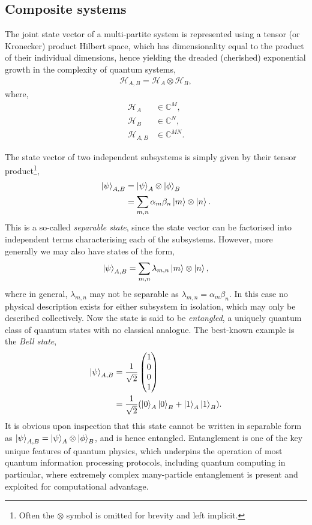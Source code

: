 \documentclass[aps,pra,twocolumn,amsmath,amssymb,nofootinbib,superscriptaddress]{revtex4}
\begin{document}
%
%

\subsection{Composite systems}

The joint state vector of a multi-partite system is represented using a tensor (or Kronecker) product Hilbert space, which has dimensionality equal to the product of their individual dimensions, hence yielding the dreaded (cherished) exponential growth in the complexity of quantum systems,
\begin{align}
\mathcal{H}_{A,B} = \mathcal{H}_A\otimes \mathcal{H}_B,	
\end{align}
where,
\begin{align}
\mathcal{H}_A &\in\mathbb{C}^M,\nonumber\\
\mathcal{H}_B &\in\mathbb{C}^N,\nonumber\\
\mathcal{H}_{A,B} &\in\mathbb{C}^{MN}.	
\end{align}

The state vector of two independent subsystems is simply given by their tensor product\footnote{Often the $\otimes$ symbol is omitted for brevity and left implicit.},
\begin{align}
\ket\psi_{A,B} &= \ket\psi_A \otimes \ket\phi_B\nonumber\\
&=\sum_{m,n} \alpha_m\beta_n\ket{m}\otimes\ket{n}.
\end{align}
This is a so-called \textit{separable state}, since the state vector can be factorised into independent terms characterising each of the subsystems. However, more generally we may also have states of the form,
\begin{align}
\ket\psi_{A,B} =\sum_{m,n} \lambda_{m,n}\ket{m}\otimes\ket{n},
\end{align}
where in general, $\lambda_{m,n}$ may not be separable as \mbox{$\lambda_{m,n}=\alpha_m\beta_n$}. In this case no physical description exists for either subsystem in isolation, which may only be described collectively. Now the state is said to be \textit{entangled}, a uniquely quantum class of quantum states with no classical analogue. The best-known example is the \textit{Bell state},
\begin{align}\label{eq:bell_state_vec_def}
\ket\psi_{A,B} &= \frac{1}{\sqrt{2}}\left(\begin{matrix}{}
  1\\
  0\\
  0\\
  1
\end{matrix}\right)\nonumber\\
&= \frac{1}{\sqrt{2}}(\ket{0}_A\ket{0}_B+\ket{1}_A\ket{1}_B).
\end{align}
It is obvious upon inspection that this state cannot be written in separable form as \mbox{$\ket\psi_{A,B} = \ket\psi_A \otimes \ket\phi_B$}, and is hence entangled. Entanglement is one of the key unique features of quantum physics, which underpins the operation of most quantum information processing protocols, including quantum computing in particular, where extremely complex many-particle entanglement is present and exploited for computational advantage.
\end{document}
